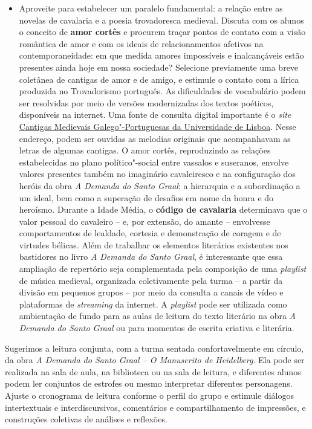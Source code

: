 \documentclass[11pt]{extarticle}
\begin{document}
\begin{itemize}
\item
  Aproveite para estabelecer um paralelo fundamental: a relação entre as
  novelas de cavalaria e a poesia trovadoresca medieval. Discuta com os
  alunos o conceito de \textbf{amor cortês} e procurem traçar pontos de
  contato com a visão romântica de amor e com os ideais de
  relacionamentos afetivos na contemporaneidade: em que medida amores
  impossíveis e inalcançáveis estão presentes ainda hoje em nossa
  sociedade? Selecione previamente uma breve coletânea de cantigas de
  amor e de amigo, e estimule o contato com a lírica produzida no
  Trovadorismo português. As dificuldades de vocabulário podem ser
  resolvidas por meio de versões modernizadas dos textos poéticos,
  disponíveis na internet. Uma fonte de consulta digital importante é o
  \emph{site} \href{https://cantigas.fcsh.unl.pt/listacantigas.asp}{Cantigas Medievais Galego"-Portuguesas da Universidade
  de Lisboa}. Nesse endereço, podem ser ouvidas as melodias
  originais que acompanhavam as letras de algumas cantigas. O amor
  cortês, reproduzindo as relações estabelecidas no plano
  político"-social entre vassalos e suseranos, envolve valores presentes
  também no imaginário cavaleiresco e na configuração dos heróis
  da obra \emph{A Demanda do Santo Graal}: a hierarquia e a subordinação a um ideal, bem como
  a superação de desafios em nome da honra e do heroísmo. Durante a
  Idade Média, o \textbf{código de cavalaria} determinava que o valor
  pessoal do cavaleiro -- e, por extensão, do amante -- envolvesse
  comportamentos de lealdade, cortesia e demonstração de coragem e de
  virtudes bélicas. Além de trabalhar os elementos literários existentes
  nos bastidores no livro \emph{A Demanda do Santo Graal}, é interessante que
  essa ampliação de repertório seja complementada pela composição de uma
  \emph{playlist} de música medieval, organizada coletivamente pela
  turma -- a partir da divisão em pequenos grupos -- por meio da
  consulta a canais de vídeo e plataformas de \emph{streaming} da
  internet. A \emph{playlist} pode ser utilizada como ambientação de
  fundo para as aulas de leitura do texto literário na obra \emph{A Demanda do Santo Graal}
  ou para momentos de escrita criativa e literária.
\end{itemize}

Sugerimos a leitura conjunta, com a turma sentada
confortavelmente em círculo, da obra \emph{A Demanda do Santo Graal -- O
Manuscrito de Heidelberg}. Ela pode ser realizada na sala de aula, na
biblioteca ou na sala de leitura, e diferentes alunos podem ler
conjuntos de estrofes ou mesmo interpretar diferentes personagens.
Ajuste o cronograma de leitura conforme o perfil do grupo e estimule
diálogos intertextuais e interdiscursivos, comentários e
compartilhamento de impressões, e construções coletivas de análises e
reflexões.
\end{document}
